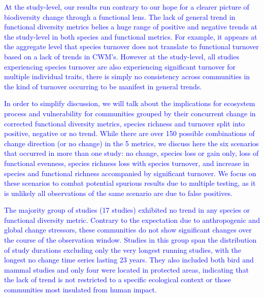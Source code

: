 \documentclass{article}
\begin{document}
\textcolor{blue}{At the study-level, our results run contrary to our hope for a clearer picture of biodiversity change through a functional lens. The lack of general trend in functional diversity metrics belies a huge range of positive and negative trends at the study-level in both species and functional metrics. For example, it appears at the aggregate level that species turnover does not translate to functional turnover based on a lack of trends in CWM's. However at the study-level, all studies experiencing species turnover are also experiencing significant turnover for multiple individual traits, there is simply no consistency across communities in the kind of turnover occurring to be manifest in general trends.}

\textcolor{blue}{In order to simplify discussion, we will talk about the implications for ecosystem process and vulnerability for communities grouped by their concurrent change in corrected functional diversity metrics, species richness and turnover split into positive, negative or no trend. While there are over 150 possible combinations of change direction (or no change) in the 5 metrics, we discuss here the six scenarios that occurred in more than one study: no change, species loss or gain only, loss of functional evenness, species richness loss with species turnover, and increase in species and functional richness accompanied by significant turnover. We focus on these scenarios to combat potential spurious results due to multiple testing, as it is unlikely all observations of the same scenario are due to false positives.}

\textcolor{blue}{The majority group of studies (17 studies) exhibited no trend in any species or functional diversity metric. Contrary to the expectation due to anthropogenic and global change stressors, these communities do not show significant changes over the course of the observation window. Studies in this group span the distribution of study durations excluding only the very longest running studies, with the longest no change time series lasting 23 years. They also included both bird and mammal studies and only four were located in protected areas, indicating that the lack of trend is not restricted to a specific ecological context or those communities most insulated from human impact.}
\end{document}
